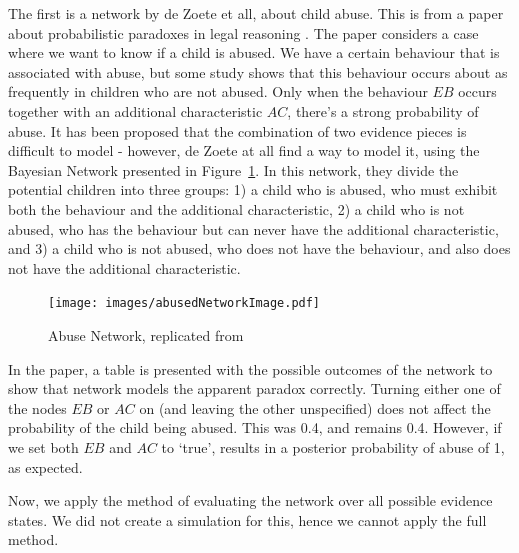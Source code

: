 \documentclass[12pt]{article}
\begin{document}
The first is a network by de Zoete et all, about child abuse. This is from a paper about probabilistic paradoxes in legal reasoning \citep{deZoete2019}. The paper considers a case where we want to know if a child is abused. We have a certain behaviour that is associated with abuse, but some study shows that this behaviour occurs about as frequently in children who are not abused. Only when the behaviour $EB$ occurs together with an additional characteristic $AC$, there's a strong probability of abuse. It has been proposed that the combination of two evidence pieces is difficult to model - however, de Zoete at all find a way to model it, using the Bayesian Network presented in Figure~\ref{pity}. In this network, they divide the potential children into three groups: 1) a child who is abused, who must exhibit both the behaviour and the additional characteristic, 2) a child who is not abused, who has the behaviour but can never have the additional characteristic, and 3) a child who is not abused, who does not have the behaviour, and also does not have the additional characteristic.
 

 \begin{figure}[htbp]
\begin{center}
\texttt{[image: images/abusedNetworkImage.pdf]}
\caption{Abuse Network, replicated from \citep{deZoete2019}}
\label{pity}
\end{center}
\end{figure}

In the paper, a table is presented with the possible outcomes of the network to show that network models the apparent paradox correctly. Turning either one of the nodes $EB$ or $AC$ on (and leaving the other unspecified) does not affect the probability of the child being abused. This was 0.4, and remains 0.4. However, if we set both $EB$ and $AC$ to `true', results in a posterior probability of abuse of 1, as expected.

Now, we apply the method of evaluating the network over all possible evidence states. We did not create a simulation for this, hence we cannot apply the full method.
\end{document}
